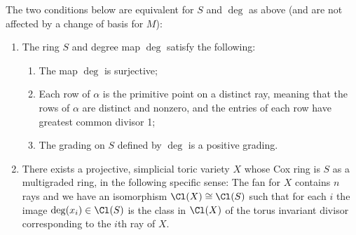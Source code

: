\documentclass{amsart}
\begin{document}
\begin{prop}\label{prop:goodMultigradings}
The two conditions below are equivalent for $S$ and $\deg$ as above (and are not affected by a change of basis for $M$):
\begin{enumerate}
    \item The ring $S$ and degree map $\deg$ satisfy the following:
      \begin{enumerate}
        \item The map $\deg$ is surjective;
        \item
        Each row of $\alpha$ is the primitive point on a distinct ray, meaning that the rows of
        $\alpha$ are distinct and nonzero, and the entries of each row have greatest common divisor 1;
        \item The grading on $S$ defined by $\deg$ is a positive grading.
    \end{enumerate}
    \item  There exists a projective, simplicial toric variety $X$ whose Cox ring is $S$ as a multigraded ring, in the following specific sense: The fan for $X$ contains $n$ rays and we have an isomorphism $\Cl(X)\cong \Cl(S)$ such that for each $i$ the image $\deg(x_i)\in \Cl(S)$ is the class in $\Cl(X)$ of the torus invariant divisor corresponding to the $i$th ray of $X$.
\end{enumerate}
\end{prop}
\end{document}
